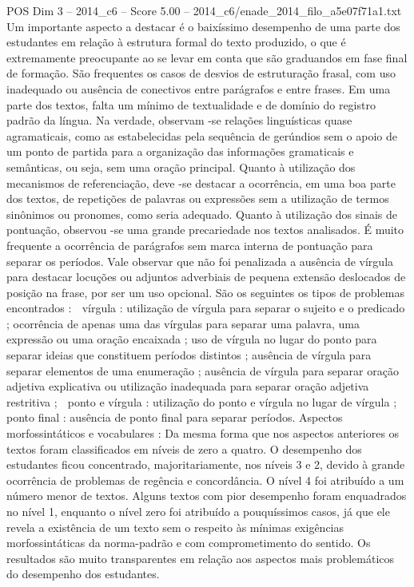 \begin{textsample}{POS Dim 3 – 2014\_c6 – Score 5.00 – 2014\_c6/enade\_2014\_filo\_a5e07f71a1.txt}
Um importante aspecto a destacar é o baixíssimo desempenho de uma parte dos estudantes em relação à estrutura formal do texto produzido, o que é extremamente preocupante ao se levar em conta que são graduandos em fase final de formação.
São frequentes os casos de desvios de estruturação frasal, com uso inadequado ou ausência de conectivos entre parágrafos e entre frases.
Em uma parte dos textos, falta um mínimo de textualidade e de domínio do registro padrão da língua.
Na verdade, observam -se relações linguísticas quase agramaticais, como as estabelecidas pela sequência de gerúndios sem o apoio de um ponto de partida para a organização das informações gramaticais e semânticas, ou seja, sem uma oração principal.
Quanto à utilização dos mecanismos de referenciação, deve -se destacar a ocorrência, em uma boa parte dos textos, de repetições de palavras ou expressões sem a utilização de termos sinônimos ou pronomes, como seria adequado.
Quanto à utilização dos sinais de pontuação, observou -se uma grande precariedade nos textos analisados.
É muito frequente a ocorrência de parágrafos sem marca interna de pontuação para separar os períodos.
Vale observar que não foi penalizada a ausência de vírgula para destacar locuções ou adjuntos adverbiais de pequena extensão deslocados de posição na frase, por ser um uso opcional.
São os seguintes os tipos de problemas encontrados :  vírgula : utilização de vírgula para separar o sujeito e o predicado ; ocorrência de apenas uma das vírgulas para separar uma palavra, uma expressão ou uma oração encaixada ; uso de vírgula no lugar do ponto para separar ideias que constituem períodos distintos ; ausência de vírgula para separar elementos de uma enumeração ; ausência de vírgula para separar oração adjetiva explicativa ou utilização inadequada para separar oração adjetiva restritiva ;  ponto e vírgula : utilização do ponto e vírgula no lugar de vírgula ;  ponto final : ausência de ponto final para separar períodos.
Aspectos morfossintáticos e vocabulares : Da mesma forma que nos aspectos anteriores os textos foram classificados em níveis de zero a quatro.
O desempenho dos estudantes ficou concentrado, majoritariamente, nos níveis 3 e 2, devido à grande ocorrência de problemas de regência e concordância.
O nível 4 foi atribuído a um número menor de textos.
Alguns textos com pior desempenho foram enquadrados no nível 1, enquanto o nível zero foi atribuído a pouquíssimos casos, já que ele revela a existência de um texto sem o respeito às mínimas exigências morfossintáticas da norma-padrão e com comprometimento do sentido.
Os resultados são muito transparentes em relação aos aspectos mais problemáticos do desempenho dos estudantes.

\end{textsample}
